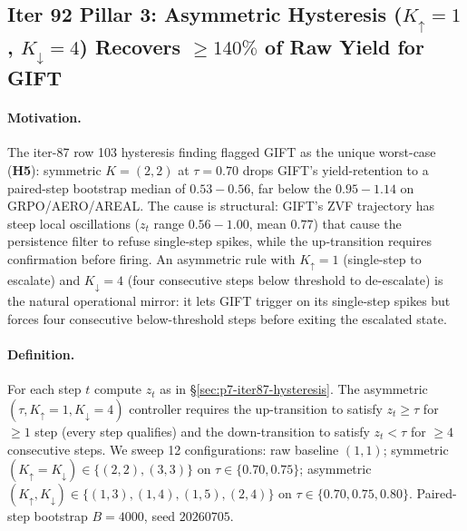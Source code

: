 \subsection{Iter 92 Pillar 3: Asymmetric Hysteresis
              ($K_{\uparrow}{=}1$, $K_{\downarrow}{=}4$) Recovers
              $\geq 140\%$ of Raw Yield for GIFT}
\label{sec:p7-iter92-asymm-hysteresis}

\paragraph{Motivation.}
The iter-87 row 103 hysteresis finding flagged GIFT as the unique
worst-case (\textbf{H5}): symmetric $K{=}(2,2)$ at $\tau{=}0.70$ drops
GIFT's yield-retention to a paired-step bootstrap median of
$0.53{-}0.56$, far below the $0.95{-}1.14$ on GRPO/AERO/AREAL.
The cause is structural: GIFT's ZVF trajectory has steep local
oscillations ($z_t$ range $0.56{-}1.00$, mean $0.77$) that cause
the persistence filter to refuse single-step spikes, while the
up-transition requires confirmation before firing.  An asymmetric
rule with $K_{\uparrow}{=}1$ (single-step to escalate) and
$K_{\downarrow}{=}4$ (four consecutive steps below threshold to
de-escalate) is the natural operational mirror: it lets GIFT
trigger on its single-step spikes but forces four consecutive
below-threshold steps before exiting the escalated state.

\paragraph{Definition.}
For each step $t$ compute $z_t$ as in
\S\ref{sec:p7-iter87-hysteresis}.  The asymmetric
$(\tau, K_{\uparrow}{=}1, K_{\downarrow}{=}4)$ controller requires
the up-transition to satisfy $z_t \ge \tau$ for $\ge 1$ step
(every step qualifies) and the down-transition to satisfy
$z_t < \tau$ for $\ge 4$ consecutive steps.  We sweep 12
configurations: raw baseline $(1,1)$; symmetric
$(K_{\uparrow}{=}K_{\downarrow}) \in \{(2,2),(3,3)\}$ on
$\tau \in \{0.70, 0.75\}$; asymmetric $(K_{\uparrow},K_{\downarrow})
\in \{(1,3),(1,4),(1,5),(2,4)\}$ on
$\tau \in \{0.70, 0.75, 0.80\}$.  Paired-step bootstrap $B{=}4000$,
seed $20260705$.

